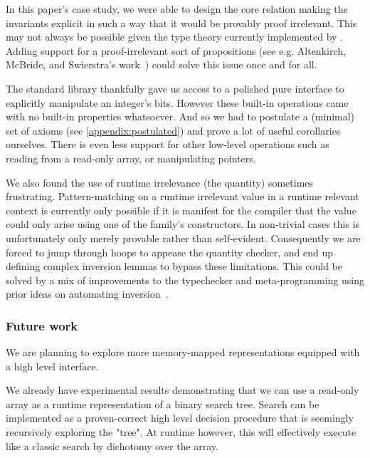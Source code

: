 In this paper's case study, we were able to design the core 
relation making the invariants explicit in such a way that it would be provably
proof irrelevant.
%
This may not always be possible given the type theory currently implemented by
\idris{}. Adding support for a proof-irrelevant sort of propositions (see e.g.
Altenkirch, McBride, and Swierstra's work~\cite{DBLP:conf/plpv/AltenkirchMS07})
could solve this issue once and for all.

The \idris{} standard library thankfully gave us access to a polished pure interface
to explicitly manipulate an integer's bits.
%
However these built-in operations came with no built-in properties whatsoever.
%
And so we had to postulate a (minimal) set of axioms (see \cref{appendix:postulated})
and prove a lot of useful corollaries ourselves.
%
There is even less support for other low-level operations such as reading from
a read-only array, or manipulating pointers.

We also found the use of runtime irrelevance (the  quantity)
sometimes frustrating.
%
Pattern-matching on a runtime irrelevant value in a runtime relevant context
is currently only possible if it is manifest for the compiler that the value
could only arise using one of the family's constructors.
%
In non-trivial cases this is unfortunately only merely provable rather than
self-evident.
%
Consequently we are forced to jump through hoops to appease the quantity
checker, and end up defining complex inversion lemmas to bypass these
limitations.
%
This could be solved by a mix of improvements to the typechecker and
meta-programming using prior ideas on automating
inversion~\cite{DBLP:conf/types/CornesT95,DBLP:conf/types/McBride96,monin:inria-00489412}.

\subsubsection{Future work}

We are planning to explore more memory-mapped representations equipped with a high
level interface.

We already have experimental results demonstrating that we can use a read-only array
as a runtime representation of a binary search tree.
%
Search can be implemented as a proven-correct high level decision procedure that
is seemingly recursively exploring the "tree".
%
At runtime however, this will effectively execute like a classic search by dichotomy
over the array.

